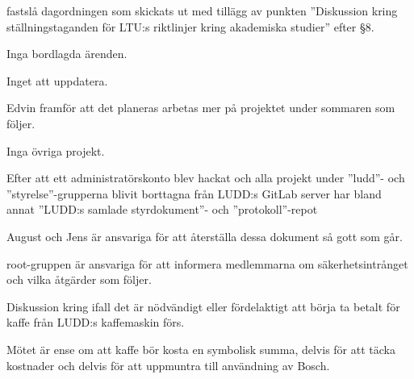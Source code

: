 \documentclass{protokoll}
\date{2019-05-07}  %
\begin{document}
\newpage  


\begin{beslut}
     \att fastslå dagordningen som skickats ut med tillägg av punkten
     ''Diskussion kring ställningstaganden för LTU:s riktlinjer kring
     akademiska studier'' efter \S 8.
\end{beslut}

Inga bordlagda ärenden.

Inget att uppdatera. 

Edvin framför att det planeras arbetas mer på projektet under sommaren som
följer. 

Inga övriga projekt. 

Efter att ett administratörskonto blev hackat och alla projekt under ''ludd''-
och ''styrelse''-grupperna blivit borttagna från LUDD:s GitLab server har bland
annat ''LUDD:s samlade styrdokument''- och ''protokoll''-repot

August och Jens är ansvariga för att återställa dessa dokument så gott som går. 

root-gruppen är ansvariga för att informera medlemmarna om säkerhetsintrånget
och vilka åtgärder som följer.

 Diskussion kring ifall det är nödvändigt eller fördelaktigt att börja ta
 betalt för kaffe från LUDD:s kaffemaskin förs. 


 Mötet är ense om att kaffe bör kosta en symbolisk summa, delvis för att täcka
 kostnader och delvis för att uppmuntra till användning av Bosch. 
\end{document}
